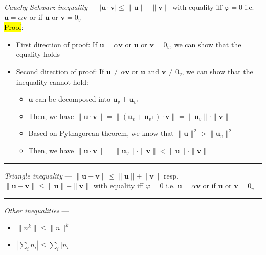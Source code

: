 \emph{Cauchy Schwarz inequality} --- 
$|\boldsymbol{u} \cdot \boldsymbol{v}| \leq \|\boldsymbol{u}\| \textrm{ } \|\boldsymbol{v}\|$ with equality iff $\varphi = 0$ i.e. $\boldsymbol{u} = \alpha\boldsymbol{v}$ or if $\boldsymbol{u} \textrm{ or } \boldsymbol{v} = 0_v$\\
\hl{Proof}:
\begin{itemize}
    \item First direction of proof: If $\boldsymbol{u} = \alpha\boldsymbol{v}$ or $\boldsymbol{u} \textrm{ or } \boldsymbol{v} = 0_v$, we can show that the equality holds
    \item Second direction of proof: If $\boldsymbol{u} \neq \alpha\boldsymbol{v}$ or $\boldsymbol{u} \textrm{ and } \boldsymbol{v} \neq 0_v$, we can show that the inequality cannot hold:
    \begin{itemize}
        \item $\boldsymbol{u}$ can be decomposed into $\boldsymbol{u}_v + \boldsymbol{u}_{v^\bot}$
        \item Then, we have $\|\boldsymbol{u} \cdot \boldsymbol{v}\| = \| (\boldsymbol{u}_v + \boldsymbol{u}_{v^\bot}) \cdot \boldsymbol{v} \| = \|\boldsymbol{u}_v\| \cdot \|\boldsymbol{v}\|$
        \item Based on Pythagorean theorem, we know that $\|\boldsymbol{u}\|^2 > \|\boldsymbol{u}_v\|^2$
        \item Then, we have $\|\boldsymbol{u} \cdot \boldsymbol{v}\| = \|\boldsymbol{u}_v\| \cdot \|\boldsymbol{v}\| < \|\boldsymbol{u}\| \cdot \|\boldsymbol{v}\|$
    \end{itemize}
\end{itemize}

{\color{lightgray}\hrule height 0.001mm}

\emph{Triangle inequality} --- 
$\|\boldsymbol{u} + \boldsymbol{v}\| \leq \|\boldsymbol{u}\| + \|\boldsymbol{v}\|$ resp. $\|\boldsymbol{u} - \boldsymbol{v}\| \leq \|\boldsymbol{u}\| + \|\boldsymbol{v}\|$ with equality iff $\varphi = 0$ i.e. $\boldsymbol{u} = \alpha\boldsymbol{v}$ or if $\boldsymbol{u} \textrm{ or } \boldsymbol{v} = 0_v$

{\color{lightgray}\hrule height 0.001mm}

\emph{Other inequalities} ---  

\begin{itemize}
    \item $\|n^k\| \leq \|n\|^k$
    \item $|\sum_i n_i| \leq \sum_i |n_i|$
\end{itemize}

